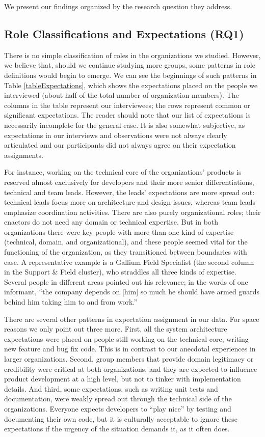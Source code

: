 \documentclass[10pt, conference, compsocconf]{IEEEtran}
\begin{document}
We present our findings organized by the research question they address.




\subsection{Role Classifications and Expectations (RQ1)}

There is no simple classification of roles in the organizations we studied. However, we believe that, should we continue studying more groups, some patterns in role definitions would begin to emerge. We can see the beginnings of such patterns in Table \ref{tableExpectations}, which shows the expectations placed on the people we interviewed (about half of the total number of organization members). The columns in the table represent our interviewees; the rows represent common or significant expectations. The reader should note that our list of expectations is necessarily incomplete for the general case. It is also somewhat subjective, as expectations in our interviews and observations were not always clearly articulated and our participants did not always agree on their expectation assignments.

For instance, working on the technical core of the organizations' products is reserved almost exclusively for developers and their more senior differentiations, technical and team leads. However, the leads' expectations are more spread out: technical leads focus more on architecture and design issues, whereas team leads emphasize coordination activities. There are also purely organizational roles; their enactors do not need any domain or technical expertise. But in both organizations there were key people with more than one kind of expertise (technical, domain, and organizational), and these people seemed vital for the functioning of the organization, as they transitioned between boundaries with ease. A representative example is a Gallium Field Specialist (the second column in the Support \& Field cluster), who straddles all three kinds of expertise. Several people in different areas pointed out his relevance; in the words of one informant, ``the company depends on [him] so much he should have armed guards behind him taking him to and from work.''

There are several other patterns in expectation assignment in our data. For space reasons we only point out three more. First, all the system architecture expectations were placed on people still working on the technical core, writing new feature and bug fix code. This is in contrast to our anecdotal experiences in larger organizations. Second, group members that provide domain legitimacy or credibility were critical at both organizations, and they are expected to influence product development at a high level, but not to tinker with implementation details. And third, some expectations, such as writing unit tests and documentation, were weakly spread out through the technical side of the organizations. Everyone expects developers to ``play nice'' by testing and documenting their own code, but it is culturally acceptable to ignore these expectations if the urgency of the situation demands it, as it often does.
\end{document}
